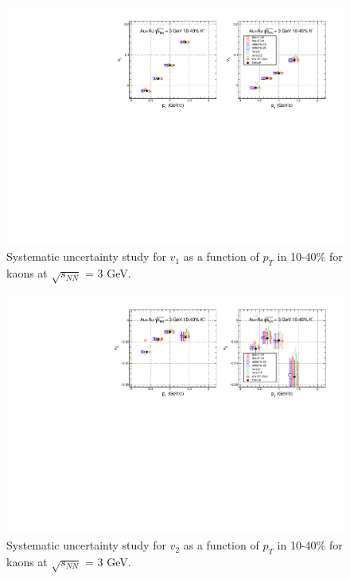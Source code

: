\begin{figure}[h]
\includegraphics[scale=0.8]{FXT3gev/chapter3/fig/sys/kaon/v1pt_kaon_sys.pdf}
\caption{Systematic uncertainty study for $v_{1}$ as a function of $p_{T}$ in 10-40\% for kaons at $\sqrt{s_{NN}}$ = 3 GeV.}
\label{fig:kaon_v1pt_sys}
\end{figure}

\begin{figure}[h]
\includegraphics[scale=0.8]{FXT3gev/chapter3/fig/sys/kaon/v2pt_kaon_sys.pdf}
\caption{Systematic uncertainty study for $v_{2}$ as a function of $p_{T}$ in 10-40\% for kaons at $\sqrt{s_{NN}}$ = 3 GeV.}
\label{fig:kaon_v2pt_sys}
\end{figure}



